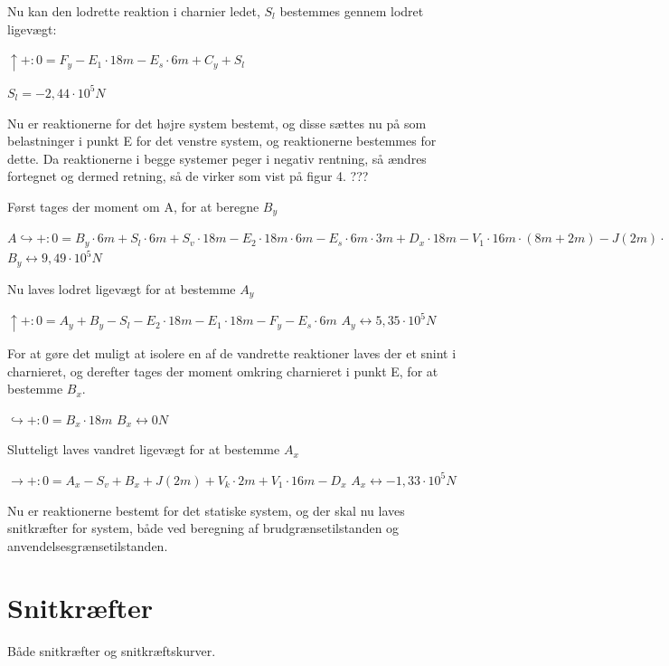 Nu kan den lodrette reaktion i charnier ledet, $S_l$ bestemmes gennem lodret ligevægt: 
\begin{center}
	$\uparrow+: 0 = F_y - E_1 \cdot 18m - E_s \cdot 6m + C_y + S_l$
\end{center}
\begin{center}	
	$S_l = -2,\!44 \cdot 10^5N$
\end{center}

Nu er reaktionerne for det højre system bestemt, og disse sættes nu på som belastninger i punkt E for det venstre system, og reaktionerne bestemmes for dette. Da reaktionerne i begge systemer peger i negativ rentning, så ændres fortegnet og dermed retning, så de virker som vist på figur 4. ???


Først tages der moment om A, for at beregne $B_y$  
\begin{center}
	$A\hookrightarrow+: 0 = B_y \cdot 6m + S_l \cdot 6m + S_v \cdot 18m - E_2 \cdot 18m \cdot 6m - E_s \cdot 6m \cdot 3m + D_x \cdot 18m - V_1 \cdot 16m \cdot (8m + 2m) - J(2m) \cdot (2m \cdot \frac{1}{3}) - V_k \cdot 2m \cdot 1m$ 
	$B_y \leftrightarrow 9,\!49 \cdot 10^5N$
\end{center}

Nu laves lodret ligevægt for at bestemme $A_y$
\begin{center}
	$\uparrow+: 0 = A_y + B_y - S_l - E_2 \cdot 18m - E_1 \cdot 18m - F_y - E_s \cdot 6 m$
	$A_y \leftrightarrow 5,\!35 \cdot 10^5N$
\end{center}

For at gøre det muligt at isolere en af de vandrette reaktioner laves der et snint i charnieret, og derefter tages der moment omkring charnieret i punkt E, for at bestemme $B_x$.
\begin{center}
	$\hookrightarrow+: 0 = B_x \cdot 18m$
	$B_x \leftrightarrow 0N$
\end{center}

Slutteligt laves vandret ligevægt for at bestemme $A_x$
\begin{center}
	$\rightarrow+: 0 = A_x - S_v + B_x + J(2m) + V_k \cdot 2m + V_1 \cdot 16 m - D_x$
	$A_x \leftrightarrow -1,\!33 \cdot 10^5N$
\end{center} 
 
 Nu er reaktionerne bestemt for det statiske system, og der skal nu laves snitkræfter for system, både ved beregning af brudgrænsetilstanden og anvendelsesgrænsetilstanden. 
 
 
\section{Snitkræfter}
Både snitkræfter og snitkræftskurver.

